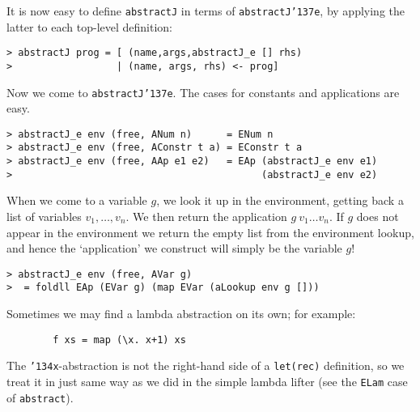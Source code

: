 It is now easy to define \mbox{\tt abstractJ} in terms of \mbox{\tt abstractJ{\char'137}e}, by
applying the latter to each top-level definition:
\begin{verbatim}
> abstractJ prog = [ (name,args,abstractJ_e [] rhs)
>                  | (name, args, rhs) <- prog]
\end{verbatim}
%
Now we come to \mbox{\tt abstractJ{\char'137}e}.  The cases for constants and
applications are easy.
\begin{verbatim}
> abstractJ_e env (free, ANum n)      = ENum n
> abstractJ_e env (free, AConstr t a) = EConstr t a
> abstractJ_e env (free, AAp e1 e2)   = EAp (abstractJ_e env e1)
>                                           (abstractJ_e env e2)
\end{verbatim}
When we come to a variable $g$, we look it up in the environment,
getting back a list of variables $v_1,\ldots,v_n$.  We then return the
application $g~v_1 \ldots v_n$.  If $g$ does not appear in the
environment we return the empty list from the environment lookup, and
hence the `application' we construct will simply be the variable
$g$!
\begin{verbatim}
> abstractJ_e env (free, AVar g)
>  = foldll EAp (EVar g) (map EVar (aLookup env g []))
\end{verbatim}
\par
Sometimes we may find a lambda abstraction on its own; for example:
\begin{verbatim}
        f xs = map (\x. x+1) xs
\end{verbatim}
The \mbox{\tt {\char'134}x}-abstraction is not the right-hand side of a \mbox{\tt let(rec)}
definition, so we treat it in just same way as we did in the simple
lambda lifter (see the \mbox{\tt ELam} case of \mbox{\tt abstract}).

